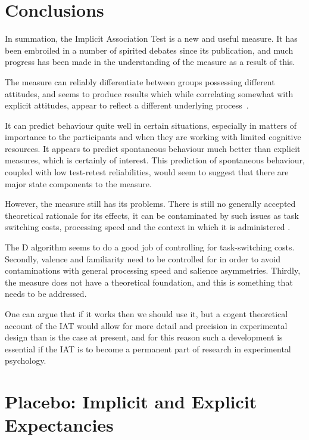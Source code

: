 \section{Conclusions}
\label{sec:conclusions}


In summation, the Implicit Association Test is a new and useful measure. It has been embroiled in a number of spirited debates since its publication, and much progress has been made in the understanding of the measure as a result of this. 

The measure can reliably differentiate between groups possessing different attitudes, and seems to produce results which while correlating somewhat with explicit attitudes, appear to reflect a different underlying process~\cite{Nosek2007a}. 

It can predict behaviour quite well in certain situations, especially in matters of importance to the participants and when they are working with limited cognitive resources. It appears to predict spontaneous behaviour much better than explicit measures, which is certainly of interest. This prediction of spontaneous behaviour, coupled with low test-retest reliabilities, would seem to suggest that there are major state components to the measure. 

However, the measure still has its problems. There is still no generally accepted theoretical rationale for its effects, it can be contaminated by such issues as task switching costs\cite{Klauer2005}, processing speed\cite{Blanton2006} and the context in which it is administered \cite{Boysen2006}. 

The D algorithm seems to do a good job of controlling for task-switching costs. Secondly, valence and familiarity need to be controlled for in order to avoid contaminations with general processing speed and salience asymmetries. Thirdly, the measure does not have a theoretical foundation, and this is something that needs to be addressed. 

One can argue that if it works then we should use it, but a cogent theoretical account of the IAT would allow for more detail and precision in experimental design  than is the case at present, and for this reason such a development is essential if the IAT is to become a permanent part of research in experimental psychology.



\section{Placebo: Implicit and Explicit Expectancies}
\label{sec:measurement-placebo}



